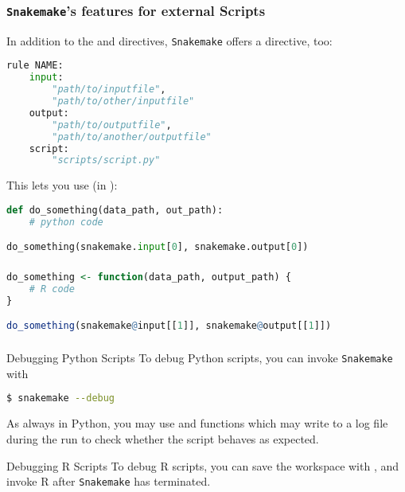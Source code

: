 \begingroup
{}
\begin{frame}[fragile]
  \frametitle{\texttt{Snakemake}'s features for external Scripts}
  In addition to the  and  directives, \texttt{Snakemake} offers a  directive, too:
  \begin{lstlisting}[language=Python,style=Python]
rule NAME:
    input:
        "path/to/inputfile",
        "path/to/other/inputfile"
    output:
        "path/to/outputfile",
        "path/to/another/outputfile"
    script:
        "scripts/script.py"
  \end{lstlisting}
  This lets you use (in ):
  \begin{lstlisting}[language=Python,style=Python]
def do_something(data_path, out_path):
    # python code

do_something(snakemake.input[0], snakemake.output[0])
  \end{lstlisting}
\end{frame}
\endgroup

\begin{frame}[fragile]
  \frametitle{}
  \begin{lstlisting}[language=R,style=R]
do_something <- function(data_path, output_path) {
    # R code
}

do_something(snakemake@input[[1]], snakemake@output[[1]])
  \end{lstlisting}
\end{frame}

\begin{frame}[fragile]
  \frametitle{}
  \begin{exampleblock}{Debugging Python Scripts}
  To debug Python scripts, you can invoke \texttt{Snakemake} with
  \begin{lstlisting}[language=Bash, style=Shell]
$ snakemake --debug
  \end{lstlisting}
  As always in Python, you may use  and  functions which may write to a log file during the run to check whether the script behaves as expected.
  \end{exampleblock}
  \pause
  \begin{exampleblock}{Debugging R Scripts}
  To debug R scripts, you can save the workspace with , and invoke R after \texttt{Snakemake} has terminated. 
  \end{exampleblock}
\end{frame}

